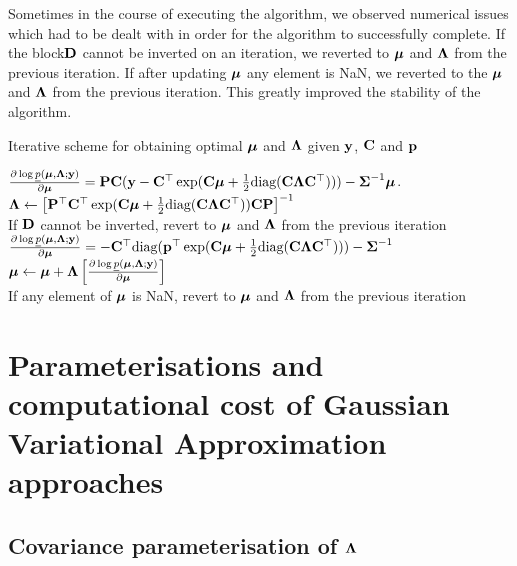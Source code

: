 \documentclass{amsart}[12pt]
\begin{document}
			Sometimes in the course of  executing the algorithm, we observed numerical issues which had to be dealt
			with in order for the algorithm to successfully complete. If the block${\bf D}$ cannot be inverted on an
			iteration, we reverted to ${\boldsymbol \mu}$ and ${\boldsymbol \Lambda}$ from the previous iteration. If after updating ${\boldsymbol \mu}$
			any element is NaN, we reverted to the ${\boldsymbol \mu}$ and ${\boldsymbol \Lambda}$ from the previous iteration. This greatly
			improved the stability of the algorithm.
			
			\begin{algorithm}
				\caption[Algorithm GVA NR]{Iterative scheme for obtaining optimal ${\boldsymbol \mu}$ and ${\boldsymbol \Lambda}$
					given ${\bf y}$, ${\bf C}$ and ${\bf p}$}
				\label{alg:algorithm_nr}
				\begin{algorithmic}
					\REQUIRE $\frac{\partial \log \underline{p}({\boldsymbol \mu}, {\boldsymbol \Lambda}; {\bf y})}{\partial {\boldsymbol\mu}} = {\bf P} {\bf C} ({\bf y} - {\bf C}^\top \exp({\bf C} {\boldsymbol \mu} + \tfrac{1}{2} \text{diag}{({\bf C}{\boldsymbol\Lambda}{\bf C}^\top)})) - {\boldsymbol \Sigma}^{-1} {\boldsymbol \mu}$.
					\STATE ${\boldsymbol \Lambda} \leftarrow \left [ {\bf P}^\top {\bf C}^\top \exp({\bf C} {\boldsymbol \mu} + \tfrac{1}{2} \text{diag}({\bf C} {\boldsymbol \Lambda} {\bf C}^\top)) {\bf C} {\bf P} \right ]^{-1}$ \\ [1ex]
					If ${\bf D}$ cannot be inverted, revert to ${\boldsymbol \mu}$ and ${\boldsymbol \Lambda}$ from the previous iteration \\ [1ex]
					\STATE $\frac{\partial \log \underline{p}({\boldsymbol \mu}, {\boldsymbol \Lambda}; {\bf y})}{\partial {\boldsymbol\mu}} = -{\bf C}^\top \text{diag}({\bf p}^\top \exp({\bf C} {\boldsymbol \mu} +\tfrac{1}{2} \text{diag}({\bf C} {\boldsymbol \Lambda} {\bf C}^\top))) - {\boldsymbol \Sigma}^{-1}$ \\ [1ex]
					\STATE ${\boldsymbol \mu} \leftarrow {\boldsymbol\mu} + {\boldsymbol \Lambda} \left [ \frac{\partial \log \underline{p}({\boldsymbol \mu}, {\boldsymbol \Lambda}; {\bf y})}{\partial {\boldsymbol\mu}} \right ]$ \\ [1ex]
					If any element of ${\boldsymbol \mu}$ is NaN, revert to ${\boldsymbol \mu}$ and ${\boldsymbol \Lambda}$ from the previous iteration
					\ENDWHILE
				\end{algorithmic}
			\end{algorithm}
					
					
			\section{Parameterisations and computational cost of Gaussian Variational Approximation approaches}
			\label{sec:param}
			\subsection{Covariance parameterisation of ${\boldsymbol \Lambda}$}
			
\end{document}
